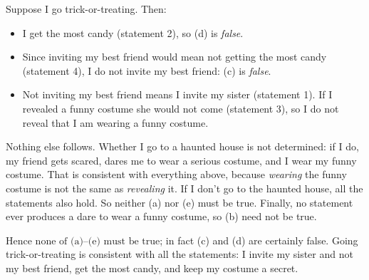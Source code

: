 Suppose I go trick-or-treating. Then:
\begin{itemize}
\item I get the most candy (statement 2), so (d) is \emph{false}.
\item Since inviting my best friend would mean not getting the most candy (statement 4), I do not invite my best friend: (c) is \emph{false}.
\item Not inviting my best friend means I invite my sister (statement 1). If I revealed a funny costume she would not come (statement 3), so I do not reveal that I am wearing a funny costume.
\end{itemize}
Nothing else follows. Whether I go to a haunted house is not determined: if I do, my friend gets scared, dares me to wear a serious costume, and I wear my funny costume. That is consistent with everything above, because \emph{wearing} the funny costume is not the same as \emph{revealing} it. If I don't go to the haunted house, all the statements also hold. So neither (a) nor (e) must be true. Finally, no statement ever produces a dare to wear a funny costume, so (b) need not be true.

Hence $\boxed{\text{none of (a)--(e) must be true}}$; in fact (c) and (d) are certainly false. Going trick-or-treating is consistent with all the statements: I invite my sister and not my best friend, get the most candy, and keep my costume a secret.
